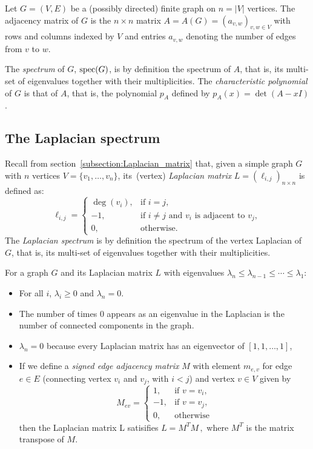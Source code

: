 Let $G = (V,E)$ be a (possibly directed) finite graph on
$n = \vert V \vert$ vertices. The adjacency matrix of $G$ is the
$n \times n$ matrix $A = A( G ) = (a_{v,w} )_{ v,w \in V }$ with rows
and columns indexed by $V$ and entries $a_{v,w}$ denoting the number
of edges from $v$ to $w$.

The {\it spectrum} of $G$, ${\rm spec}(G)$, is by definition the spectrum of $A$,
that is, its multi-set of eigenvalues together with their multiplicities.
The {\it characteristic polynomial} of $G$ is that of $A$, that is,
the polynomial $p_A$ defined by $p_A ( x ) = \det (A- x I )$.



\subsection{The Laplacian spectrum}

Recall from section~\ref{subsection:Laplacian_matrix} that, given a
simple graph $G$ with $n$ vertices $V = \{v_1, \dots, v_n\}$,
its~(vertex) \emph{Laplacian matrix}
$L = (\ell_{i,j})_{n \times n}$ is defined as:
\[
\ell_{i,j}
=
\begin{cases}
\deg(v_i), & \text{if } i = j, \\
-1, & \text{if } i \neq j \text{ and } v_i \text{ is adjacent to } v_j, \\
0, & \mbox{otherwise}.
\end{cases}
\]
The {\it Laplacian spectrum} is by definition the spectrum of the
vertex Laplacian of $G$,
that is, its multi-set of eigenvalues together with their multiplicities.

For a graph $G$ and its Laplacian matrix $L$ with eigenvalues
$\lambda_n \le \lambda_{n-1} \le \cdots \le \lambda_{1}$:

\begin{itemize}
\item
For all $i$, $\lambda_i \ge 0$ and $\lambda_n = 0$.
\item
   The number of times $0$ appears as an eigenvalue in the
Laplacian is the number of connected components in the graph.
\item
$\lambda_n=0$ because every Laplacian matrix has an eigenvector of
$[1,1,\dots,1]$,
\item
If we define a {\it signed edge adjacency matrix} $M$ with element
$m_{e,v}$ for edge $e\in E$ (connecting vertex $v_i$ and $v_j$, with
$i < j$) and vertex $v\in V$ given by
\[
M_{ev}
=
\begin{cases}
1,  & \text{if } v = v_i, \\
-1, & \text{if } v = v_j, \\
0,  & \text{otherwise}
\end{cases}
\]
then the Laplacian matrix L satisifies
$    L = M^{T} M\,,$
where $M^T$ is the matrix transpose of $M$.
\end{itemize}

